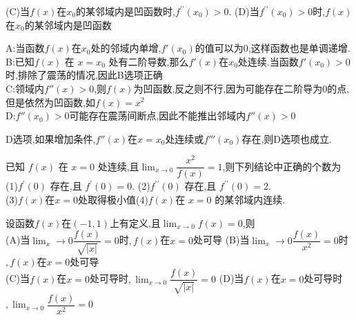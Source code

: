 \documentclass[8pt a4paper, oneside, UTF8]{ctexbook}  %
\begin{document}
\begin{sloppypar}
\begin{problem}
        (C)当$f(x)$在$x_0$的某邻域内是凹函数时,$f^{\prime\prime}(x_0)>0.$
        (D)当$f^{\prime\prime}(x_0)>0$时,$f(x)$在$x_0$的某邻域内是凹函数
    \end{problem}
    \begin{solution}
        A:当函数$f(x)$在$x_0$处的邻域内单增,$f'(x_0)$的值可以为0,这样函数也是单调递增.\\
        B:已知$f(x)$ 在 $x=x_0$ 处有二阶导数,那么$f'(x)$在$x_0$处连续.当函数$f'(x_0)>0$时,排除了震荡的情况,因此B选项正确\\
        C:领域内$f''(x)>0$,则$f(x)$为凹函数,反之则不行,因为可能存在二阶导为0的点,但是依然为凹函数,如$f(x)=x^2$\\
        D:$f''(x_0)>0$可能存在震荡间断点,因此不能推出邻域内$f''(x)>0$
    \end{solution}
    \begin{note}
      D选项,如果增加条件,$f''(x)$在$x=x_0$处连续或$f'''(x_0)$存在,则D选项也成立.
    \end{note}
    \begin{problem}
        已知 $f(x)$ 在 $x=0$ 处连续,且$\lim_{x\to 0}\dfrac{x^2}{f(x)}=1$,则下列结论中正确的个数为\\
        (1)$f^{\prime}(0)$ 存在,且 $f^\prime(0)=0.$ \quad (2)$f^{\prime\prime}(0)$ 存在,且 $f^{\prime\prime}(0)=2.$\\
        (3)$f(x)$在$x=0$处取得极小值\quad (4)$f\left(x\right)$在 $x=0$ 的某邻域内连续.
    \end{problem}
    \begin{solution}
            
    \end{solution}
    \begin{note}
            
    \end{note}
    \begin{problem}
        设函数$f(x)$在$(-1,1)$上有定义,且$\lim_{x\to0}f(x)=0$,则\\
        (A)当$\lim_x\to0\dfrac{f(x)}{\sqrt{|x|}}=0$时$,f(x)$在$x=0$处可导
        (B)当$\lim_x\to0\dfrac{f(x)}{x^{2}}=0$时$,f(x)$在$x=0$处可导\\
        (C)当$f(x)$在$x=0$处可导时$,\lim_{x\to0}\dfrac{f(x)}{\sqrt{|x|}}=0$\quad
        (D)当$f(x)$在$x=0$处可导时$,\lim_{x\to0}\dfrac{f(x)}{x^{2}}=0$        
    \end{problem}
    \begin{solution}
            
    \end{solution}
    \begin{note}
            

\end{note}
\end{sloppypar}
\end{document}
